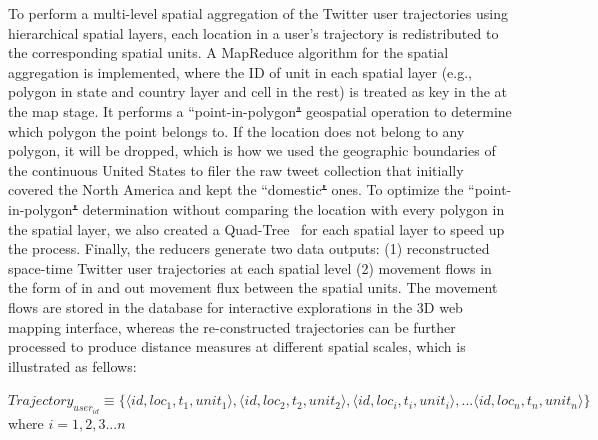 \documentclass[ijgi,article,submit,moreauthors,pdftex,10pt,a4paper]{mdpi}
\theoremstyle{mdpi}
\newcounter{thm}
\newcounter{ex}
\newcounter{re}
\theoremstyle{mdpidefinition}
\providecommand{\DIFadd}[1]{{\protect\color{blue}\uwave{#1}}} %
\providecommand{\DIFdel}[1]{{\protect\color{red}\sout{#1}}}                      %
\providecommand{\DIFaddbegin}{} %
\providecommand{\DIFaddend}{} %
\providecommand{\DIFdelbegin}{} %
\providecommand{\DIFdelend}{} %
\begin{document}
To perform a multi-level spatial aggregation of the Twitter user trajectories using hierarchical spatial layers, each location in a user's trajectory is redistributed to the corresponding spatial units.
A MapReduce algorithm for the spatial aggregation is implemented, where the ID of unit in each spatial layer (e.g., polygon in state and country layer and cell in the rest) is treated as key in the at the map stage.
It performs a ``point-in-polygon\DIFdelbegin \DIFdel{" }\DIFdelend \DIFaddbegin \DIFadd{'' }\DIFaddend geospatial operation to determine which polygon the point belongs to.
If the location does not belong to any polygon, it will be dropped, which is how we used the geographic boundaries of the continuous United States to filer the raw tweet collection that initially covered the North America and kept the ``domestic\DIFdelbegin \DIFdel{" }\DIFdelend \DIFaddbegin \DIFadd{'' }\DIFaddend ones.
To optimize the ``point-in-polygon\DIFdelbegin \DIFdel{" }\DIFdelend \DIFaddbegin \DIFadd{'' }\DIFaddend determination without comparing the location with every polygon in the spatial layer, we also created a Quad-Tree~\cite{samet1984quadtree} for each spatial layer to speed up the process.
Finally, the reducers generate two data outputs: (1) reconstructed space-time Twitter user trajectories at each spatial level (2) movement flows in the form of in and out movement flux between the spatial units.
The movement flows are stored in the database for interactive explorations in the 3D web mapping interface, whereas the re-constructed trajectories can be further processed to produce distance measures at different spatial scales, which is illustrated as fellows:
\newline

\noindent $Trajectory_{user_{id}} \equiv \lbrace \langle id, loc_{1}, t_{1}, unit_{1}\rangle, \langle id, loc_{2}, t_{2}, unit_{2}\rangle, \langle id, loc_{i}, t_{i}, unit_{i}\rangle, ... \langle id, loc_{n}, t_{n}, unit_{n}\rangle \rbrace$
where $ i = 1, 2, 3...n$
\end{document}
